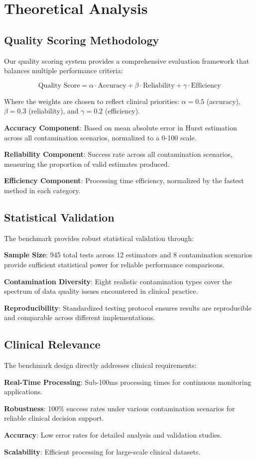 \section{Theoretical Analysis}

\subsection{Quality Scoring Methodology}

Our quality scoring system provides a comprehensive evaluation framework that balances multiple performance criteria:

\begin{equation}
\text{Quality Score} = \alpha \cdot \text{Accuracy} + \beta \cdot \text{Reliability} + \gamma \cdot \text{Efficiency}
\end{equation}

Where the weights are chosen to reflect clinical priorities: $\alpha = 0.5$ (accuracy), $\beta = 0.3$ (reliability), and $\gamma = 0.2$ (efficiency).

\textbf{Accuracy Component}: Based on mean absolute error in Hurst estimation across all contamination scenarios, normalized to a 0-100 scale.

\textbf{Reliability Component}: Success rate across all contamination scenarios, measuring the proportion of valid estimates produced.

\textbf{Efficiency Component}: Processing time efficiency, normalized by the fastest method in each category.

\subsection{Statistical Validation}

The benchmark provides robust statistical validation through:

\textbf{Sample Size}: 945 total tests across 12 estimators and 8 contamination scenarios provide sufficient statistical power for reliable performance comparisons.

\textbf{Contamination Diversity}: Eight realistic contamination types cover the spectrum of data quality issues encountered in clinical practice.

\textbf{Reproducibility}: Standardized testing protocol ensures results are reproducible and comparable across different implementations.

\subsection{Clinical Relevance}

The benchmark design directly addresses clinical requirements:

\textbf{Real-Time Processing}: Sub-100ms processing times for continuous monitoring applications.

\textbf{Robustness}: 100\% success rates under various contamination scenarios for reliable clinical decision support.

\textbf{Accuracy}: Low error rates for detailed analysis and validation studies.

\textbf{Scalability}: Efficient processing for large-scale clinical datasets.
